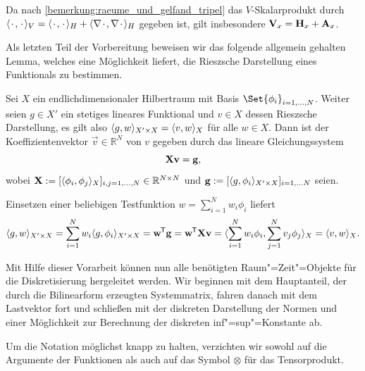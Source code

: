 \documentclass[../main.tex]{subfiles}
\begin{document}
Da nach \cref{bemerkung:raeume_und_gelfand_tripel} das $V$-Skalarprodukt durch $\langle{\mkern2mu\cdot\mkern2mu},{\mkern2mu\cdot\mkern2mu}\rangle_{V} = \langle{\mkern2mu\cdot\mkern2mu},{\mkern2mu\cdot\mkern2mu}\rangle_{H} + \langle\nabla{\mkern2mu\cdot\mkern2mu},\nabla{\mkern2mu\cdot\mkern2mu}\rangle_{H}$ gegeben ist, gilt insbesondere $\mathbf{V}_{x} = \mathbf{H}_{x} + \mathbf{A}_{x}$.

Als letzten Teil der Vorbereitung beweisen wir das folgende allgemein gehalten Lemma, welches eine Möglichkeit liefert, die Rieszsche Darstellung eines Funktionals zu bestimmen.

\begin{Lemma}\label{lemma:berechnung_der_rieszschen_darstellung}
    Sei $X$ ein endlichdimensionaler Hilbertraum mit Basis $\Set{ \phi_{i} }_{i = 1, \dots, N }$.
    Weiter seien $g \in X'$ ein stetiges lineares Funktional und $v \in X$ dessen Rieszsche Darstellung, es gilt also $\langle g,w\rangle_{X' \times X} = \langle v,w\rangle_{X}$ für alle $w \in X$.
    Dann ist der Koeffizientenvektor $\vec{v} \in \mathbb{R}^{N}$ von $v$ gegeben durch das lineare Gleichungssystem
    \begin{equation}
        \mathbf{X} \mathbf{v} = \mathbf{g},
    \end{equation}
    wobei $\mathbf{X} := [\langle\phi_{i},\phi_{j}\rangle_{X}]_{i,j = 1, \dots, N} \in \mathbb{R}^{N \times N}$ und $\mathbf{g} := [\langle g,\phi_{i}\rangle_{X' \times X}]_{i = 1, \dots N}$ seien.

    \begin{Beweis}
        Einsetzen einer beliebigen Testfunktion $w = \sum_{i = 1}^{N} w_{i} \phi_{i}$ liefert
        \begin{equation}
            \langle g,w\rangle_{X' \times X}
            = \sum_{i = 1}^{N} w_i \langle g,\phi_{i}\rangle_{X' \times X}
            = \mathbf{w}^{\mkern-1.5mu\mathsf{T}} \mathbf{g}
            = \mathbf{w}^{\mkern-1.5mu\mathsf{T}} \mathbf{X} \mathbf{v}
            = \langle\sum_{i = 1}^{N} w_i \phi_{i},\sum_{j = 1}^{N} v_j \phi_{j}\rangle_{X}
            = \langle v,w\rangle_{X}.
        \end{equation}
    \end{Beweis}
\end{Lemma}

Mit Hilfe dieser Vorarbeit können nun alle benötigten Raum"=Zeit"=Objekte für die Diskretisierung hergeleitet werden.
Wir beginnen mit dem Hauptanteil, der durch die Bilinearform erzeugten Systemmatrix, fahren danach mit dem Lastvektor fort und schließen mit der diskreten Darstellung der Normen und einer Möglichkeit zur Berechnung der diskreten inf"=sup"=Konstante ab.

Um die Notation möglichst knapp zu halten, verzichten wir sowohl auf die Argumente der Funktionen als auch auf das Symbol $\otimes$ für das Tensorprodukt.
\end{document}
